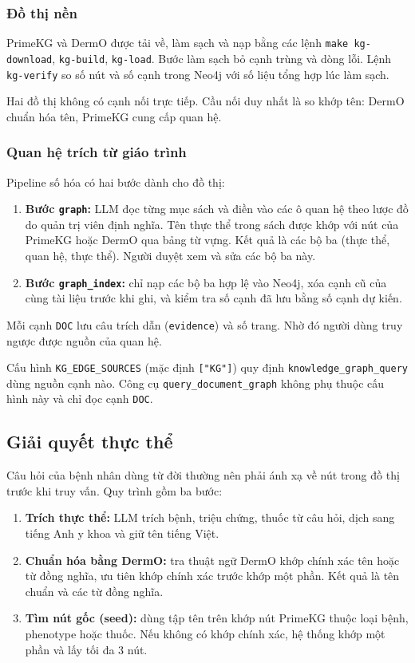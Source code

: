 \subsubsection{Đồ thị nền}

PrimeKG và DermO được tải về, làm sạch và nạp bằng các lệnh \texttt{make kg-download}, \texttt{kg-build}, \texttt{kg-load}. Bước làm sạch bỏ cạnh trùng và dòng lỗi. Lệnh \texttt{kg-verify} so số nút và số cạnh trong Neo4j với số liệu tổng hợp lúc làm sạch.

Hai đồ thị không có cạnh nối trực tiếp. Cầu nối duy nhất là so khớp tên: DermO chuẩn hóa tên, PrimeKG cung cấp quan hệ.

\subsubsection{Quan hệ trích từ giáo trình}

Pipeline số hóa có hai bước dành cho đồ thị:
\begin{enumerate}
  \item \textbf{Bước \texttt{graph}:} LLM đọc từng mục sách và điền vào các ô quan hệ theo lược đồ do quản trị viên định nghĩa. Tên thực thể trong sách được khớp với nút của PrimeKG hoặc DermO qua bảng từ vựng. Kết quả là các bộ ba (thực thể, quan hệ, thực thể). Người duyệt xem và sửa các bộ ba này.
  \item \textbf{Bước \texttt{graph\_index}:} chỉ nạp các bộ ba hợp lệ vào Neo4j, xóa cạnh cũ của cùng tài liệu trước khi ghi, và kiểm tra số cạnh đã lưu bằng số cạnh dự kiến.
\end{enumerate}

Mỗi cạnh \texttt{DOC} lưu câu trích dẫn (\texttt{evidence}) và số trang. Nhờ đó người dùng truy ngược được nguồn của quan hệ.

Cấu hình \texttt{KG\_EDGE\_SOURCES} (mặc định \texttt{["KG"]}) quy định \texttt{knowledge\_graph\_query} dùng nguồn cạnh nào. Công cụ \texttt{query\_document\_graph} không phụ thuộc cấu hình này và chỉ đọc cạnh \texttt{DOC}.

\subsection{Giải quyết thực thể}

Câu hỏi của bệnh nhân dùng từ đời thường nên phải ánh xạ về nút trong đồ thị trước khi truy vấn. Quy trình gồm ba bước:
\begin{enumerate}
  \item \textbf{Trích thực thể:} LLM trích bệnh, triệu chứng, thuốc từ câu hỏi, dịch sang tiếng Anh y khoa và giữ tên tiếng Việt.
  \item \textbf{Chuẩn hóa bằng DermO:} tra thuật ngữ DermO khớp chính xác tên hoặc từ đồng nghĩa, ưu tiên khớp chính xác trước khớp một phần. Kết quả là tên chuẩn và các từ đồng nghĩa.
  \item \textbf{Tìm nút gốc (seed):} dùng tập tên trên khớp nút PrimeKG thuộc loại bệnh, phenotype hoặc thuốc. Nếu không có khớp chính xác, hệ thống khớp một phần và lấy tối đa 3 nút.
\end{enumerate}

